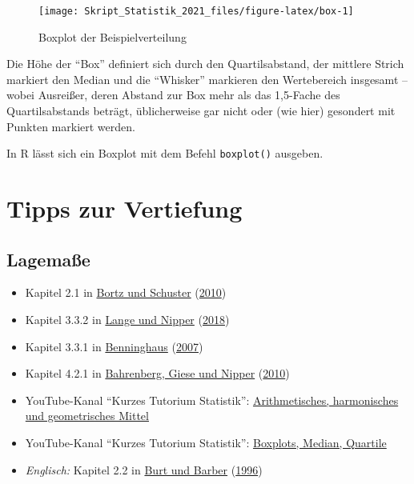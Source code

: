 \documentclass[
  11pt,
  ngerman,
  a4paper,
]{report}
\providecommand{\tightlist}{%
  \setlength{\itemsep}{0pt}\setlength{\parskip}{0pt}}
\newenvironment{rtip}{
  \medskip
  \begin{tcolorbox}[colframe=purple,colback=light_gray,title=Softwarehinweis]
}{
  \end{tcolorbox}
  \medskip
}
\begin{document}
\begin{figure}[!h]

{\centering \texttt{[image: Skript\_Statistik\_2021\_files/figure-latex/box-1]} 

}

\caption{Boxplot der Beispielverteilung}\label{fig:box}
\end{figure}

Die Höhe der \enquote{Box} definiert sich durch den Quartilsabstand, der mittlere Strich markiert den Median und die \enquote{Whisker} markieren den Wertebereich insgesamt -- wobei Ausreißer, deren Abstand zur Box mehr als das 1,5-Fache des Quartilsabstands beträgt, üblicherweise gar nicht oder (wie hier) gesondert mit Punkten markiert werden.

\begin{rtip}
In R lässt sich ein Boxplot mit dem Befehl \verb|boxplot()| ausgeben.
\end{rtip}

\hypertarget{tipps-zur-vertiefung-1}{%
\section*{Tipps zur Vertiefung}\label{tipps-zur-vertiefung-1}}

\hypertarget{lagemauxdfe-1}{%
\subsection{Lagemaße}\label{lagemauxdfe-1}}

\begin{itemize}
\tightlist
\item
  Kapitel 2.1 in \protect\hyperlink{ref-bortz}{Bortz und Schuster} (\protect\hyperlink{ref-bortz}{2010})
\item
  Kapitel 3.3.2 in \protect\hyperlink{ref-delange}{Lange und Nipper} (\protect\hyperlink{ref-delange}{2018})
\item
  Kapitel 3.3.1 in \protect\hyperlink{ref-benninghaus}{Benninghaus} (\protect\hyperlink{ref-benninghaus}{2007})
\item
  Kapitel 4.2.1 in \protect\hyperlink{ref-bahrenberg}{Bahrenberg, Giese und Nipper} (\protect\hyperlink{ref-bahrenberg}{2010})
\item
  YouTube-Kanal \enquote{Kurzes Tutorium Statistik}: \href{https://www.youtube.com/watch?v=Kx9aHOMVPEg}{Arithmetisches, harmonisches und geometrisches Mittel}
\item
  YouTube-Kanal \enquote{Kurzes Tutorium Statistik}: \href{https://www.youtube.com/watch?v=HsDeAoBOyS4}{Boxplots, Median, Quartile}
\item
  \emph{Englisch:} Kapitel 2.2 in \protect\hyperlink{ref-burt}{Burt und Barber} (\protect\hyperlink{ref-burt}{1996})
\end{itemize}
\end{document}

